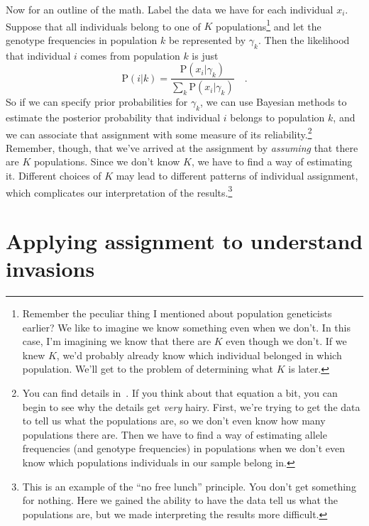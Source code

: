 \documentclass[12pt]{article}
\begin{document}
Now for an outline of the math. Label the data we have for each
individual $x_i$. Suppose that all individuals belong to one of $K$
populations\footnote{Remember the peculiar thing I mentioned about
  population geneticists earlier? We like to imagine we know something
  even when we don't. In this case, I'm imagining we know that there
  are $K$ even though we don't. If we knew $K$, we'd probably already
  know which individual belonged in which population. We'll get to the
  problem of determining what $K$ is later.} and let the genotype
frequencies in population $k$ be represented by $\gamma_k$. Then the
likelihood that individual $i$ comes from population $k$ is just
\[
\mbox{P}(i|k) = \frac{\mbox{P}(x_i|\gamma_k)}{\sum_k
  \mbox{P}(x_i|\gamma_k)} \quad .
\]
So if we can specify prior probabilities for $\gamma_k$, we can use
Bayesian methods to estimate the posterior probability that individual
$i$ belongs to population $k$, and we can associate that assignment
with some measure of its reliability.\footnote{You can find details
  in~\cite{Pritchard-etal-2000}. If you think about that equation a
  bit, you can begin to see why the details get {\it very\/}
  hairy. First, we're trying to get the data to tell us what the
  populations are, so we don't even know how many populations there
  are. Then we have to find a way of estimating allele frequencies
  (and genotype frequencies) in populations when we don't even know
  which populations individuals in our sample belong in.}  Remember,
though, that we've arrived at the assignment by {\it assuming\/} that
there are $K$ populations. Since we don't know $K$, we have to find a
way of estimating it. Different choices of $K$ may lead to different
patterns of individual assignment, which complicates our
interpretation of the results.\footnote{This is an example of the ``no
  free lunch'' principle. You don't get something for nothing. Here we
  gained the ability to have the data tell us what the populations
  are, but we made interpreting the results more difficult.}

\section*{Applying assignment to understand invasions}
\end{document}
